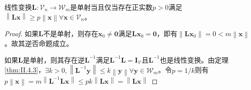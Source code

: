 \documentclass[../main.tex]{subfiles}
\begin{document}
\begin{lemma}\label{thm:inv_func_l1}
    线性变换$\mathbf{L}:\mathcal{V}_n\rightarrow\mathcal{W}_m$是单射当且仅当存在正实数$p>0$满足$\left\|\mathbf{Lx}\right\|\geq p \left\|\mathbf{x}\right\|\forall\mathbf{x}\in\mathcal{V}_n$。
\end{lemma}
\begin{proof}
    如果$\mathbf{L}$不是单射，则存在$\mathbf{x}_0\neq\mathbf{0}$满足$\mathbf{Lx}_0=\mathbf{0}$，即有$\left\|\mathbf{Lx}_0\right\|=0<m\left\|\mathbf{x}\right\|$。故其逆否命题成立。

    如果$\mathbf{L}$是单射，则其存在逆$\mathbf{L}^{-1}$满足$\mathbf{L}^{-1}\mathbf{L}=\mathbf{I}_\mathcal{V}$且$\mathbf{L}^{-1}$也是线性变换。由定理\ref{thm:II.4.3}，$\exists k>0, \left\|\mathbf{L}^{-1}\mathbf{y}\right\|\leq k\left\|\mathbf{y}\right\|\forall\mathbf{y}\in\mathcal{W}_m$。令$p=1/k$则有$p\left\|\mathbf{x}\right\|=m\left\|\mathbf{L}^{-1}\mathbf{Lx}\right\|\leq pk\left\|\mathbf{Lx}\right\|=\left\|\mathbf{Lx}\right\|$
\end{proof}
\end{document}
